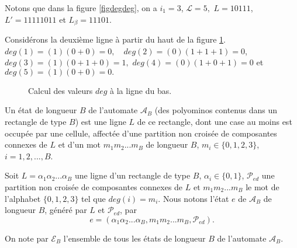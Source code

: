 Notons que dans la figure \ref{figdegdeg}, on a $i_{1}=3$, $\mathcal{L}=5,$ $L=10111$, $L'=11111011$ et $L_{\beta}=11101$.
\begin{Ex}\label{exdeg}
Considérons la deuxième ligne à partir du haut de la figure \ref{figdeg}.
$deg(1)=(1)(0+0)=0,\quad deg(2)=(0)(1+1+1)=0$, $deg(3)=(1)(0+1+0)=1,$ $deg(4)=(0)(1+0+1)=0$  et  $deg(5)=(1)(0+0)=0.$
\begin{figure}[!htb]
\begin{minipage}[c]{.16\linewidth}
        \centering
\end{minipage}
\hfill
\begin{minipage}[c]{.66\linewidth}
        \centering
\begin{logicpuzzle}[rows=2,columns=5,color=cyan!100, width=750px,scale=0.5]
\framepuzzle[black!50]
\end{logicpuzzle}
\end{minipage}
\caption{\label{figdeg} Calcul des valeurs  $deg$ à la ligne du bas.}
\end{figure} 
\end{Ex}
\begin{Def}\label{def20}
Un état de longueur $B$ de l'automate $\mathcal{A}_{B}$ (des polyominos contenus dans un rectangle de type $B$) est une ligne $L$ de ce rectangle, dont une case au moins est occupée par une cellule, affectée d'une  partition non croisée de composantes connexes  de $L$ et d'un mot  $m_{1}m_{2}...m_{B}$  de longueur $B$, $m_{i}\in\{0,1,2,3\}$, $i=1,2,...,B$. 
\end{Def}
\begin{Not}
Soit $L=\alpha_{1}\alpha_{2}...\alpha_{B}$ une ligne d'un rectangle de type $B$,  $\alpha_{i}\in\{0,1\}$, $\mathcal{P}_{ed}$ une partition non croisée de composantes connexes  de $L$ et $m_{1}m_{2}...m_{B}$ le mot de l'alphabet $\{0,1,2,3\}$ tel que $deg(i)=m_{i}$. Nous notons l'état $e$ de $\mathcal{A}_{B}$ de longueur $B$, généré par $L$ et $\mathcal{P}_{ed}$, par
\[e=(\alpha_{1}\alpha_{2}...\alpha_{B},m_{1}m_{2}...m_{B},\mathcal{P}_{ed}).\]

On note par $\mathcal{E}_{B}$ l'ensemble de tous les états de longueur $B$ de l'automate $\mathcal{A}_{B}$.
\end{Not}
